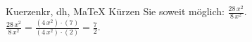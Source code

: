 \begin{MAufgabe}{Kuerzen}{kr, dh, MaTeX}
K\"urzen Sie soweit m\"oglich: $\frac{28\, x^2}{8\, x^2}$.\\ 
\ifLsg\MLoesung
\quad $\frac{28\, x^2}{8\, x^2}=\frac{(4\, x^2)\cdot(7)}{(4\, x^2)\cdot(2)}=\frac{7}{2}$.\else\relax\fi
 \end{MAufgabe}